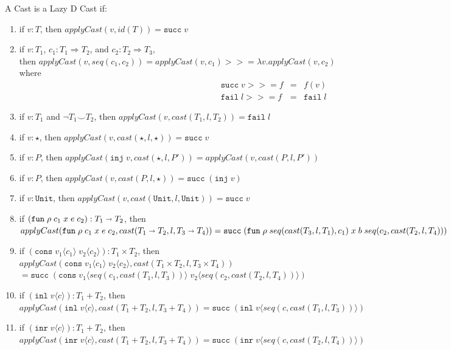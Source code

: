 \documentclass[acmsmall,review,anonymous]{acmart}\settopmatter{printfolios=true,printccs=false,printacmref=false}
\newcommand{\plus}[0]{+}
\newcommand{\judgeType}[2]{#1 : #2}
\newcommand{\judgeTypeFT}[3]{#1 : #2 \Longrightarrow #3} %
\newcommand{\TOOdyn}[0]{\star}
\newcommand{\POOunit}[0]{\mathtt{Unit}}
\newcommand{\POOfun}[2]{#1 \shortrightarrow #2}
\newcommand{\POOprod}[2]{#1 \times #2}
\newcommand{\POOsum}[2]{#1 \plus #2}
\newcommand{\rOOsucc}[1]{\mathtt{succ}\;#1}
\newcommand{\rOOfail}[1]{\mathtt{fail}\;#1}
\newcommand{\hcvOOinj}[2]{\mathtt{inj} \; #2}
\newcommand{\hcvOOfun}[5]{\mathtt{fun} \; #2 \; #1 \; #3 \; #4 \; #5}
\newcommand{\hcvOOcons}[4]{\mathtt{cons}\;#1\langle#2\rangle\;#3\langle#4\rangle}
\newcommand{\hcvOOinl}[2]{\mathtt{inl}\;#1\langle#2\rangle}
\newcommand{\hcvOOinr}[2]{\mathtt{inr}\;#1\langle#2\rangle}
\begin{document}
\begin{definition}
  \label{def:surely-lazyd}
  A  Cast is a Lazy D Cast if:
  \begin{enumerate}
  \item if $v : T$, then $applyCast(v,id(T)) = \mathtt{succ} \; v $
  \item if $\judgeType{v}{T_1}$,
    $ \judgeTypeFT{c_1}{T_1}{T_2}$, and
    $ \judgeTypeFT{c_2}{T_2}{T_3}$,\\
    then $applyCast(v,seq(c_1,c_2)) = 
    applyCast(v,c_1) >>= \lambda v.applyCast(v,c_2)$\\
    where 
    \[
    \begin{array}{rcl}
      \rOOsucc{v} >>= f & = & f(v) \\
      \rOOfail{l} >>= f & = & \rOOfail{l}
    \end{array}
    \]
  \item if $v : T_1$ and $\neg T_1 \smile T_2$,
    then $applyCast(v,cast(T_1, l, T_2)) = \rOOfail{l} $
  \item if $v : \star$, 
    then $applyCast(v,cast(\TOOdyn,l,\TOOdyn)) = \rOOsucc{v} $
  \item if $v : P$,
    then $applyCast(\hcvOOinj{P}{v},cast(\star,l,P')) 
    = applyCast(v,cast(P,l,P')) $
  \item if $v : P$,
    then $applyCast(v,cast(P,l,\star)) = \rOOsucc{(\hcvOOinj{P}{v})} $
  \item if $v : \POOunit$,
    then $applyCast(v,cast(\POOunit,l,\POOunit)) = \rOOsucc{v} $
  \item if $(\hcvOOfun{c_1}{\rho}{x}{e}{c_2}) : \POOfun{T_1}{T_2}$,
    then\\
    $ 
    applyCast(\hcvOOfun{c_1}{\rho}{x}{e}{c_2}, 
    cast(\POOfun{T_1}{T_2},l,\POOfun{T_3}{T_4})) \\
    = 
    \rOOsucc{(\hcvOOfun{seq(cast(T_3,l,T_1),c_1)}{\rho}{x}{b}{seq(c_2,cast(T_2,l,T_4))})}$
  \item if $(\hcvOOcons{v_1}{c_1}{v_2}{c_2}) : \POOprod{T_1}{T_2}$,
    then \\
    $ 
    applyCast(\hcvOOcons{v_1}{c_1}{v_2}{c_2},cast(\POOprod{T_1}{T_2},l,T_3 
    \times 
    T_4))$\\
    $ = 
    \rOOsucc{(\hcvOOcons{v_1}{seq(c_1,cast(T_1,l,T_3))}{v_2}{seq(c_2,cast(T_2,l,T_4))})}
    $ 
  \item if $(\hcvOOinl{v}{c}) : \POOsum{T_1}{T_2}$,
    then \\
    $ 
    applyCast(\hcvOOinl{v}{c},cast(\POOsum{T_1}{T_2},l,\POOsum{T_3}{T_4}))
    = \rOOsucc{(\hcvOOinl{v}{seq(c,cast(T_1,l,T_3))})} $
  \item if $(\hcvOOinr{v}{c}) : \POOsum{T_1}{T_2}$,
    then \\$
    applyCast(\hcvOOinr{v}{c},cast(\POOsum{T_1}{T_2},l,\POOsum{T_3}{T_4}))
    = \rOOsucc{(\hcvOOinr{v}{seq(c,cast(T_2,l,T_4))})} $
  \end{enumerate}
\end{definition}
\end{document}
